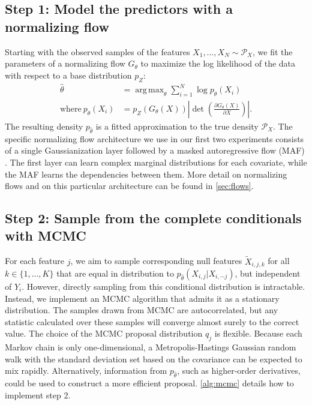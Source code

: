\documentclass{article}
\DeclareMathOperator*{\argmax}{arg\,max}
\begin{document}
\subsection*{Step 1: Model the predictors with a normalizing flow}
Starting with the observed samples of the features $X_{1}, \dots, X_{N} \sim \mathcal P_{X}$, we fit the parameters of a normalizing flow $G_\theta$ to maximize the log likelihood of the data with respect to a base distribution $p_Z$:
\begin{equation}
  \label{eq:objective_normalizing_flow}
  \begin{split}
        \hat \theta &= \argmax_\theta \sum_{i=1}^{N} \log p_{\theta}(X_{i}) \\
        \text{where}~p_\theta(X_i) &= p_Z(G_\theta(X)) \left| \det \left( \frac{\partial G_\theta(X)}{\partial X} \right) \right |.
  \end{split}
\end{equation}
The resulting density $p_{\hat \theta}$ is a fitted approximation to the true density $\mathcal P_X$.
The specific normalizing flow architecture we use in our first two experiments consists of a single Gaussianization layer \citep{mengGaussianizationFlows2020b} followed by a masked autoregressive flow (MAF) \citep{papamakariosMaskedAutoregressiveFlow2017}.
The first layer can learn complex marginal distributions for each covariate, while the MAF learns the dependencies between them.
More detail on normalizing flows and on this particular architecture can be found in \cref{sec:flows}.

\subsection*{Step 2: Sample from the complete conditionals with MCMC}


For each feature $j$, we aim to sample corresponding null features $\tilde X_{i, j, k}$ for all $k \in \{1, \dots, K\}$ that are equal in distribution to $p_{\hat \theta}(X_{i, j} | X_{i, -j})$, but independent of $Y_{i}$.
However, directly sampling from this conditional distribution is intractable.
Instead, we implement an MCMC algorithm that admits it as a stationary distribution.
The samples drawn from MCMC are autocorrelated, but any statistic calculated over these samples will converge almost surely to the correct value.
The choice of the MCMC proposal distribution $q_{j}$ is flexible.
Because each Markov chain is only one-dimensional, a Metropolis-Hastings Gaussian random walk with the standard deviation set based on the covariance can be expected to mix rapidly.
Alternatively, information from $p_{\hat \theta}$, such as higher-order derivatives, could be used to construct a more efficient proposal.
\cref{alg:mcmc} details how to implement step 2.
\end{document}
